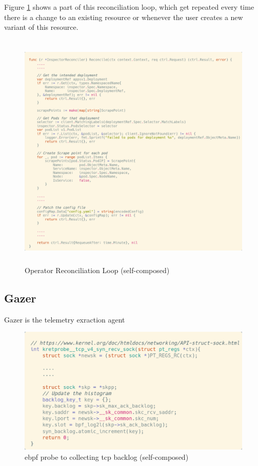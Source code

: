 Figure \ref{fig:reconcile-loop} shows a part of this reconciliation loop, which get repeated every time there is a change to an existing resource or whenever the user creates a new variant of this resource.

\begin{figure}[H]
    \includegraphics[height=11.5cm]{assets/implementation/reconcile-loop.png}
    \caption{Operator Reconciliation Loop (self-composed)}
    \label{fig:reconcile-loop}
\end{figure}



\subsection{Gazer}

Gazer is the telemetry exraction agent

\begin{figure}[H]
    \includegraphics[width=14cm]{assets/implementation/backlog-probe.png}
    \caption{\ac{ebpf} probe to collecting tcp backlog (self-composed)}
    \label{fig:backlog-probe}
\end{figure}






